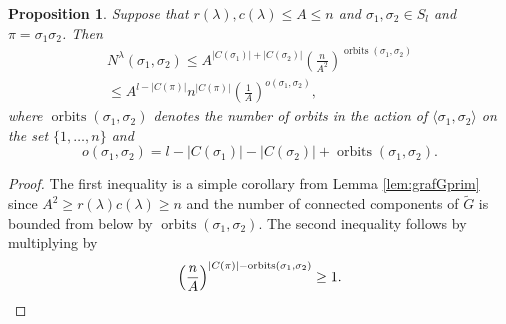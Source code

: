 \documentclass[12pt]{amsart}
\theoremstyle{plain}
\newtheorem{proposition}[lemma]{Proposition}
\theoremstyle{remark}
\DeclareMathOperator{\orbits}{orbits}
\begin{document}
\begin{proposition}
\label{prop:bipartite-graphs}
Suppose that $r(\lambda),c(\lambda) \leq A \leq n$ and $\sigma_1,\sigma_2\in S_l$ and $\pi=\sigma_1 \sigma_2$.
Then
\begin{multline}
\label{eq:swider}
N^\lambda(\sigma_1,\sigma_2)  \leq  A^{|C(\sigma_1)|+|C(\sigma_2)|}\left(\frac{n}{A^2}\right)^{\orbits(\sigma_1,\sigma_2)} 
\\ \leq   A^{l-|C(\pi)|} n^{|C(\pi)|}
\left(\frac{1}{A}\right)^{o(\sigma_1,\sigma_2)},
\end{multline}
where $\orbits(\sigma_1,\sigma_2)$ denotes the number of orbits in the action of 
$\langle \sigma_1,\sigma_2\rangle$ on the set
$\{1,\dots,n\}$ and
$$o(\sigma_1,\sigma_2)=l-|C(\sigma_1)|-|C(\sigma_2)| +\orbits(\sigma_1,\sigma_2).$$
\end{proposition}
\begin{proof}
The first inequality is a simple corollary from Lemma \ref{lem:grafGprim} since
$A^2\geq r(\lambda) c(\lambda) \geq n$ and the number of connected components of $\tilde{G}$ is bounded from below
by $\orbits(\sigma_1,\sigma_2)$.
The second inequality follows by multiplying by 
\begin{displaymath} \left( \frac{n}{A}
\right)^{|C(\pi)|-\orbits(\sigma_1,\sigma_2)} 
\geq 1.\qedhere
\end{displaymath}
\end{proof}
\end{document}

